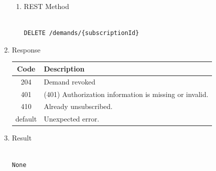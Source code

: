 \begin{enumerate}
\begin{enumerate}
\item REST Method

\begin{tcolorbox}[boxrule=0pt, frame empty]
\begin{verbatim} 

DELETE /demands/{subscriptionId}

\end{verbatim}
\end{tcolorbox}

\end{enumerate}

\item Response

\begin{center}
\begin{tabular}{|c|l|} 
\hline
\rowcolor{lightgray}	Code 		& 	Description \\
\hline
204	 		&	Demand revoked \\
\hline
401			&	(401) Authorization information is missing or invalid. \\
\hline
410			&	Already unsubscribed. \\
\hline
default		&	Unexpected error. \\
\hline
\end{tabular}
\end{center}

\item Result

\begin{tcolorbox}[boxrule=0pt, frame empty]
\begin{verbatim}

None

\end{verbatim}
\end{tcolorbox}







\end{enumerate}
